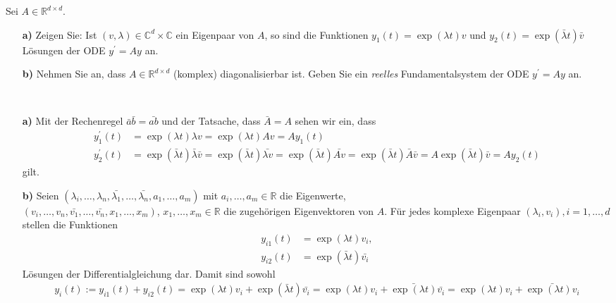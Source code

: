 \begin{exercise}
Sei $A \in \mathbb{R}^{d\times d}$.
\begin{itemize}
  \item [\textbf{a)}]Zeigen Sie: Ist $(v,\lambda) \in \mathbb{C}^d
  \times \mathbb{C}$ ein Eigenpaar von $A$, so sind die Funktionen
  $y_1(t) = \exp(\lambda t)v$ und $y_2(t) = \exp(\bar{\lambda}t)\bar{v}$
  Lösungen der ODE $y^{\prime} = Ay$ an.
  \item [\textbf{b)}] Nehmen Sie an, dass $A \in \mathbb{R}^
  {d \times d}$ (komplex) diagonalisierbar ist. Geben Sie ein
  \textit{reelles} Fundamentalsystem der ODE $y^{\prime} = Ay$ an.
\end{itemize}
\end{exercise}
\begin{solution}
\leavevmode \\
\begin{itemize}
  \item [\textbf{a)}]
  Mit der Rechenregel $\bar{a}\bar{b} = \bar{ab}$ und der Tatsache, dass $\bar{A} = A$
  sehen wir ein, dass
  \begin{align*}
    y_1^{\prime}(t) &= \exp(\lambda t)\lambda v = \exp(\lambda t)A v = Ay_1(t) \\
    y_2^{\prime}(t) &= \exp(\bar{\lambda}t)\bar{\lambda}\bar{v} = \exp(\bar{\lambda}t) \bar{\lambda v} =
    \exp(\bar{\lambda}t) \bar{Av} =  \exp(\bar{\lambda}t) \bar{A}\bar{v} = A\exp(\bar{\lambda}t)\bar{v} = Ay_2(t)
  \end{align*}
  gilt.
  \item [\textbf{b)}]
  Seien $(\lambda_i,\dots,\lambda_n,\bar{\lambda_1},\dots,\bar{\lambda_n},a_1,\dots,a_m)$
  mit $a_i,\dots,a_m \in \mathbb{R}$ die Eigenwerte, \\
  $(v_i,\dots,v_n,\bar{v_1},\dots,\bar{v_n},x_1,\dots,x_m)$, $x_1,\dots,x_m \in \mathbb{R}$
  die zugehörigen Eigenvektoren von $A$.
  Für jedes komplexe Eigenpaar $(\lambda_i, v_i), i = 1,\dots,d$ stellen die Funktionen
  \begin{align*}
    y_{i1}(t) &= \exp(\lambda t)v_i, \\
    y_{i2}(t) &= \exp(\bar{\lambda} t)\bar{v_i}
  \end{align*}
  Lösungen der Differentialgleichung dar. Damit sind sowohl
  \begin{align*}
    y_i(t) := y_{i1}(t) + y_{i2}(t) = \exp(\lambda t)v_i + \exp(\bar{\lambda} t)\bar{v_i}
    = \exp(\lambda t)v_i + \bar{\exp(\lambda t)}\bar{v_i}
    = \exp(\lambda t)v_i + \bar{\exp(\lambda t)v_i}

\end{align*}
\end{itemize}
\end{solution}
